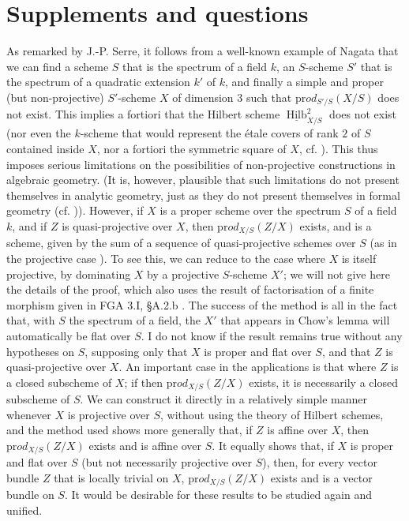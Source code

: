 \section{Supplements and questions}\label{fga3.iv-7}


As remarked by J.-P. Serre, it follows from a well-known example of Nagata that we can find a scheme $S$ that is the spectrum of a field $k$, an $S$-scheme $S'$ that is the spectrum of a quadratic extension $k'$ of $k$, and finally a simple and proper (but non-projective) $S'$-scheme $X$ of dimension $3$ such that $\mathrm{pr}od_{S'/S}(X/S)$ does not exist.
This implies a fortiori that the Hilbert scheme $\underline{\operatorname{Hilb}}_{X/S}^2$ does not exist (nor even the $k$-scheme that would represent the étale covers of rank $2$ of $S$ contained inside $X$, nor a fortiori the symmetric square of $X$, cf. ).
This thus imposes serious limitations on the possibilities of non-projective constructions in algebraic geometry.
(It is, however, plausible that such limitations do not present themselves in analytic geometry, just as they do not present themselves in formal geometry (cf. )).
However, if $X$ is a proper scheme over the spectrum $S$ of a field $k$, and if $Z$ is quasi-projective over $X$, then $\mathrm{pr}od_{X/S}(Z/X)$ exists, and is a scheme, given by the sum of a sequence of quasi-projective schemes over $S$ (as in the projective case ).
To see this, we can reduce to the case where $X$ is itself projective, by dominating $X$ by a projective $S$-scheme $X'$;
we will not give here the details of the proof, which also uses the result of factorisation of a finite morphism given in FGA 3.I, §A.2.b .
The success of the method is all in the fact that, with $S$ the spectrum of a field, the $X'$ that appears in Chow's lemma will automatically be flat over $S$.
I do not know if the result remains true without any hypotheses on $S$, supposing only that $X$ is proper and flat over $S$, and that $Z$ is quasi-projective over $X$.
An important case in the applications is that where $Z$ is a closed subscheme of $X$;
if then $\mathrm{pr}od_{X/S}(Z/X)$ exists, it is necessarily a closed subscheme of $S$.
We can construct it directly in a relatively simple manner whenever $X$ is projective over $S$, without using the theory of Hilbert schemes, and the method used shows more generally that, if $Z$ is affine over $X$, then $\mathrm{pr}od_{X/S}(Z/X)$ exists and is affine over $S$.
It equally shows that, if $X$ is proper and flat over $S$ (but not necessarily projective over $S$), then, for every vector bundle $Z$ that is locally trivial on $X$, $\mathrm{pr}od_{X/S}(Z/X)$ exists and is a vector bundle on $S$.
It would be desirable for these results to be studied again and unified.

